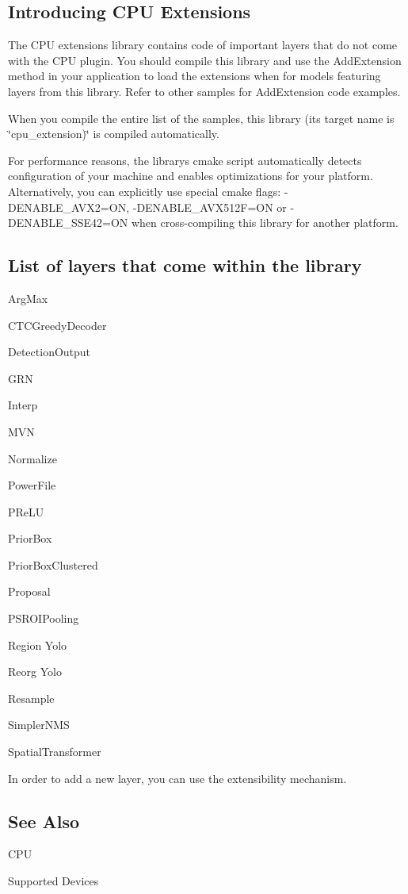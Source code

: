 \subsection*{Introducing C\+PU Extensions}

The C\+PU extensions library contains code of important layers that do not come with the C\+PU plugin. You should compile this library and use the {\ttfamily Add\+Extension} method in your application to load the extensions when for models featuring layers from this library. Refer to other samples for {\ttfamily Add\+Extension} code examples.

When you compile the entire list of the samples, this library (it\textquotesingle{}s target name is \char`\"{}cpu\+\_\+extension)\char`\"{} is compiled automatically.

For performance reasons, the library\textquotesingle{}s cmake script automatically detects configuration of your machine and enables optimizations for your platform. Alternatively, you can explicitly use special cmake flags\+: {\ttfamily -\/\+D\+E\+N\+A\+B\+L\+E\+\_\+\+A\+V\+X2=ON}, {\ttfamily -\/\+D\+E\+N\+A\+B\+L\+E\+\_\+\+A\+V\+X512F=ON} or {\ttfamily -\/\+D\+E\+N\+A\+B\+L\+E\+\_\+\+S\+S\+E42=ON} when cross-\/compiling this library for another platform.

\subsection*{List of layers that come within the library}


\begin{DoxyItemize}
\item Arg\+Max
\item C\+T\+C\+Greedy\+Decoder
\item Detection\+Output
\item G\+RN
\item Interp
\item M\+VN
\item Normalize
\item Power\+File
\item P\+Re\+LU
\item Prior\+Box
\item Prior\+Box\+Clustered
\item Proposal
\item P\+S\+R\+O\+I\+Pooling
\item Region Yolo
\item Reorg Yolo
\item Resample
\item Simpler\+N\+MS
\item Spatial\+Transformer
\end{DoxyItemize}

In order to add a new layer, you can use the extensibility mechanism.

\subsection*{See Also}


\begin{DoxyItemize}
\item C\+PU
\item Supported Devices 
\end{DoxyItemize}